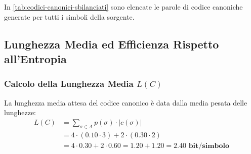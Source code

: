 In \autoref{tab:codici-canonici-sbilanciati} sono elencate le parole di codice canoniche generate per tutti i simboli della sorgente.

\begin{table}[H]
\centering
\caption{Parole di codice canoniche assegnate all'alfabeto sbilanciato $A$.}
\label{tab:codici-canonici-sbilanciati}
\vspace{2mm}
\end{table}

\FloatBarrier
\subsection{Lunghezza Media ed Efficienza Rispetto all'Entropia}
\label{subsec:lunghezza-media-entropia-sbilanciato}

\subsubsection*{Calcolo della Lunghezza Media $L(C)$}
La lunghezza media attesa del codice canonico \`e data dalla media pesata delle lunghezze:
\begin{align}
  L(C) &= \sum_{\sigma \in A} p(\sigma) \cdot |c(\sigma)| \nonumber \\
       &= 4 \cdot (0.10 \cdot 3) + 2 \cdot (0.30 \cdot 2) \nonumber \\
       &= 4 \cdot 0.30 + 2 \cdot 0.60 = 1.20 + 1.20 = \mathbf{2.40 \text{ bit/simbolo}}
\end{align}

